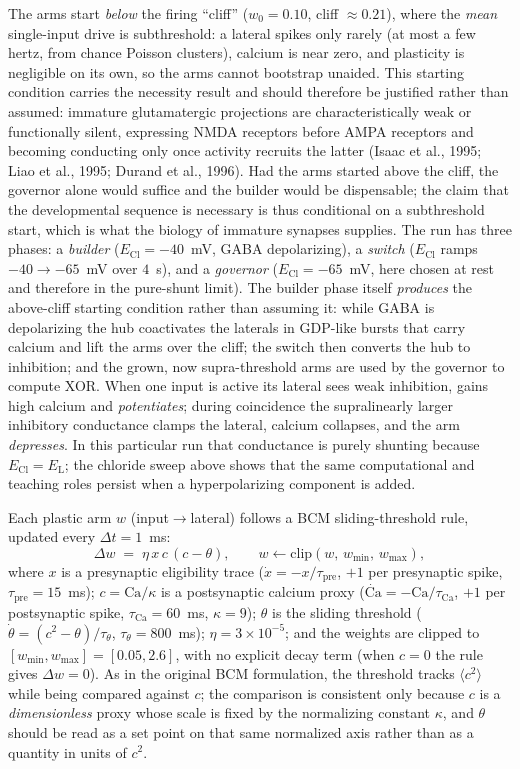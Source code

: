 \documentclass[11pt,a4paper]{article}
\newcommand{\ECl}{E_{\mathrm{Cl}}}
\begin{document}
The arms start \emph{below} the firing ``cliff'' ($w_0=0.10$, cliff $\approx0.21$), where the \emph{mean} single-input drive is subthreshold: a lateral spikes only rarely (at most a few hertz, from chance Poisson clusters), calcium is near zero, and plasticity is negligible on its own, so the arms cannot bootstrap unaided. This starting condition carries the necessity result and should therefore be justified rather than assumed: immature glutamatergic projections are characteristically weak or functionally silent, expressing NMDA receptors before AMPA receptors and becoming conducting only once activity recruits the latter (Isaac et al., 1995; Liao et al., 1995; Durand et al., 1996). Had the arms started above the cliff, the governor alone would suffice and the builder would be dispensable; the claim that the developmental sequence is necessary is thus conditional on a subthreshold start, which is what the biology of immature synapses supplies. The run has three phases: a \emph{builder} ($\ECl=-40$~mV, GABA depolarizing), a \emph{switch} ($\ECl$ ramps $-40\to-65$~mV over $4$~s), and a \emph{governor} ($\ECl=-65$~mV, here chosen at rest and therefore in the pure-shunt limit). The builder phase itself \emph{produces} the above-cliff starting condition rather than assuming it: while GABA is depolarizing the hub coactivates the laterals in GDP-like bursts that carry calcium and lift the arms over the cliff; the switch then converts the hub to inhibition; and the grown, now supra-threshold arms are used by the governor to compute XOR. When one input is active its lateral sees weak inhibition, gains high calcium and \emph{potentiates}; during coincidence the supralinearly larger inhibitory conductance clamps the lateral, calcium collapses, and the arm \emph{depresses}. In this particular run that conductance is purely shunting because $\ECl=E_{\mathrm{L}}$; the chloride sweep above shows that the same computational and teaching roles persist when a hyperpolarizing component is added.

Each plastic arm $w$ (input$\to$lateral) follows a BCM sliding-threshold rule, updated every $\Delta t=1$~ms:
\begin{equation}
\Delta w \;=\; \eta\,x\,c\,(c-\theta),\qquad w \leftarrow \mathrm{clip}(w,\,w_{\min},\,w_{\max}),
\label{eq:bcm}
\end{equation}
where $x$ is a presynaptic eligibility trace ($\dot{x}=-x/\tau_{\mathrm{pre}}$, $+1$ per presynaptic spike, $\tau_{\mathrm{pre}}=15$~ms); $c=\mathrm{Ca}/\kappa$ is a postsynaptic calcium proxy ($\dot{\mathrm{Ca}}=-\mathrm{Ca}/\tau_{\mathrm{Ca}}$, $+1$ per postsynaptic spike, $\tau_{\mathrm{Ca}}=60$~ms, $\kappa=9$); $\theta$ is the sliding threshold ($\dot{\theta}=(c^{2}-\theta)/\tau_{\theta}$, $\tau_{\theta}=800$~ms); $\eta=3\times10^{-5}$; and the weights are clipped to $[w_{\min},w_{\max}]=[0.05,2.6]$, with no explicit decay term (when $c=0$ the rule gives $\Delta w=0$). As in the original BCM formulation, the threshold tracks $\langle c^{2}\rangle$ while being compared against $c$; the comparison is consistent only because $c$ is a \emph{dimensionless} proxy whose scale is fixed by the normalizing constant $\kappa$, and $\theta$ should be read as a set point on that same normalized axis rather than as a quantity in units of $c^{2}$.
\end{document}
